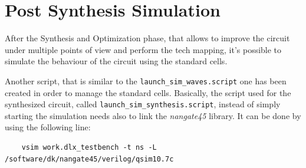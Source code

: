 \section{Post Synthesis Simulation}
After the Synthesis and Optimization phase, that allows to improve the circuit under multiple points of view and perform the tech mapping, it's possible to simulate the behaviour of the circuit using the standard cells.

Another script, that is similar to the \texttt{launch\_sim\_waves.script} one has been created in order to manage the standard cells. Basically, the script used for the synthesized circuit, called \texttt{launch\_sim\_synthesis.script}, instead of simply starting the simulation needs also to link the \textit{nangate45} library. It can be done by using the following line:
\begin{lstlisting}
	vsim work.dlx_testbench -t ns -L /software/dk/nangate45/verilog/qsim10.7c 
\end{lstlisting}
